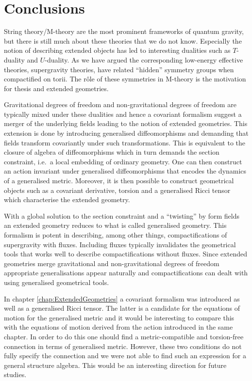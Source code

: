 \chapter{Conclusions}
String theory/M-theory are the most prominent frameworks of quantum gravity, but there is still much about these theories that we do not know. Especially the notion of describing extended objects has led to interesting dualities such as $T$-duality and $U$-duality. As we have argued the corresponding low-energy effective theories, supergravity theories, have related ``hidden'' symmetry groups when compactified on torii. The rôle of these symmetries in M-theory is the motivation for thesis and extended geometries. 

Gravitational degrees of freedom and non-gravitational degrees of freedom are typically mixed under these dualities and hence a covariant formalism suggest a merger of the underlying fields leading to the notion of extended geometries. This extension is done by introducing generalised diffeomorphisms and demanding that fields transform covariantly under such transformations. This is equivalent to the closure of algebra of diffeomorphisms which in turn demands the section constraint, i.e.\ a local embedding of ordinary geometry. One can then construct an action invariant under generalised diffeomorphisms that encodes the dynamics of a generalised metric. Moreover, it is then possible to construct geometrical objects such as a covariant derivative, torsion and a generalised Ricci tensor which characterise the extended geometry. 

With a global solution to the section constraint and a ``twisting'' by form fields an extended geometry reduces to what is called generalised geometry. This formalism is potent in describing, among other things, compactifications of supergravity with fluxes. Including fluxes typically invalidates the geometrical tools that works well to describe compactifications without fluxes. Since extended geometries merge gravitational and non-gravitational degrees of freedom appropriate generalisations appear naturally and compactifications can dealt with using generalised geometrical tools. 

In chapter \ref{chap:ExtendedGeometries} a covariant formalism was introduced as well as a generalised Ricci tensor. The latter is a candidate for the equations of motion for the generalised metric and it would be interesting to compare this with the equations of motion derived from the action introduced in the same chapter. In order to do this one should find a metric-compatible and torsion-free connection in terms of generalised metric. However, these two conditions do not fully specify the connection and we were not able to find such an expression for a general structure algebra. This would be an interesting direction for future studies. 

